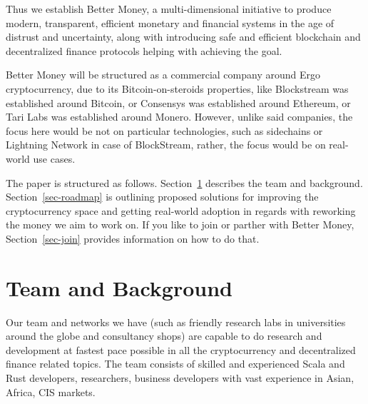 \documentclass{llncs}   %
\begin{document}
Thus we establish Better Money, a multi-dimensional initiative to produce modern, transparent, efficient monetary and financial systems in the age of distrust and uncertainty, along with introducing safe and efficient blockchain and decentralized finance protocols helping with
achieving the goal.

Better Money will be structured as a commercial company around Ergo cryptocurrency, due to its Bitcoin-on-steroids properties,
like Blockstream was established around Bitcoin, or Consensys was established around Ethereum, or Tari Labs was established around Monero. However, unlike said companies,
the focus here would be not on particular technologies, such as sidechains or Lightning Network in case of BlockStream, rather,
the focus would be on real-world use cases.

The paper is structured as follows. Section~\ref{sec-team} describes the team and background. Section~\ref{sec-roadmap} is
outlining proposed solutions for improving the cryptocurrency space and getting real-world adoption in regards with reworking the money
we aim to work on. If you like to join or parther with Better Money, Section~\ref{sec-join} provides information on
how to do that.

\section{Team and Background}
\label{sec-team}

Our team and networks we have (such as friendly research labs in universities around the globe and consultancy shops) are
capable to do research and development at fastest pace possible in all the cryptocurrency and decentralized finance related
topics. The team consists of skilled and experienced Scala and Rust developers, researchers, business developers with
vast experience in Asian, Africa, CIS markets.
\end{document}
